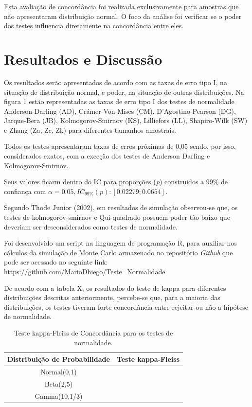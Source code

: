 \documentclass[a4paper,11pt]{article} %
\begin{document}
Esta avaliação de concordância foi realizada exclusivamente para amostras que não apresentaram distribuição normal. O foco da análise foi verificar se o poder dos testes influencia diretamente na concordância entre eles.

\section{Resultados e Discussão}
Os resultados serão apresentados de acordo com as taxas de erro tipo I, na situação de distribuição normal, e poder, na situação de outras distribuições. Na figura 1 estão representadas as taxas de erro tipo I dos testes de normalidade Anderson-Darling (AD), Crámer-Von-Mises (CM), D’Agostino-Pearson (DG), Jarque-Bera (JB), Kolmogorov-Smirnov (KS), Lilliefors (LL), Shapiro-Wilk (SW) e Zhang (Za, Zc, Zk) para diferentes tamanhos amostrais. \vskip0.3cm

Todos os testes apresentaram taxas de erros próximas de 0,05 sendo, por isso, considerados exatos, com a exceção dos testes de Anderson Darling e Kolmogorov-Smirnov. \vskip0.3cm

Seus valores ficarm dentro do IC para proporções (\textit{p}) construídos a 99\% de confiança com $\alpha = 0.05, IC_{99\%}(p): [0.02279;0.0654].$
\vskip0.3cm

Segundo Thode Junior (2002), em resultados de simulação observou-se que, os testes de kolmogorov-smirnov e Qui-quadrado possuem poder tão baixo que deveriam ser desconsiderados como testes de normalidade.\vskip0.3cm

Foi desenvolvido um script na linguagem de programação R, para auxiliar nos cálculos da simulação de Monte Carlo armazenado no repositório \textit{Github} que pode ser acessado no seguinte link: \href{https://github.com/MarioDhiego/Teste\_Normalidade}{https://github.com/MarioDhiego/Teste\_Normalidade}
\vskip0.3cm


De acordo com a tabela X, os resultados do teste de kappa para diferentes distribuições descritas anteriormente, percebe-se que, para a maioria das distribuições, os testes tiveram forte concordância entre rejeitar ou não a hipótese de normalidade. 



\begin{table}[H]
\centering
 \begin{tabular}{c|c}
\hline \hline
Distribuição de Probabilidade  &  Teste kappa-Fleiss\\
\hline
      Normal(0,1)              &  \\
      Beta(2,5)                & \\
      Gamma(10,1/3)            & \\
\hline \hline
    \end{tabular}
    \caption{Teste kappa-Fleiss de Concordância para os testes de normalidade.}
    \label{tab:my_label}
\end{table}
\end{document}
